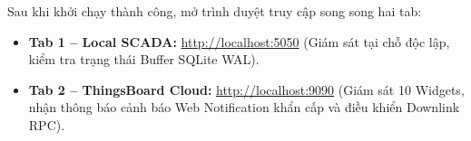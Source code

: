 Sau khi khởi chạy thành công, mở trình duyệt truy cập song song hai tab:
\begin{itemize}
    \item \textbf{Tab 1 -- Local SCADA:} \url{http://localhost:5050} (Giám sát tại chỗ độc lập, kiểm tra trạng thái Buffer SQLite WAL).
    \item \textbf{Tab 2 -- ThingsBoard Cloud:} \url{http://localhost:9090} (Giám sát 10 Widgets, nhận thông báo cảnh báo Web Notification khẩn cấp và điều khiển Downlink RPC).
\end{itemize}

